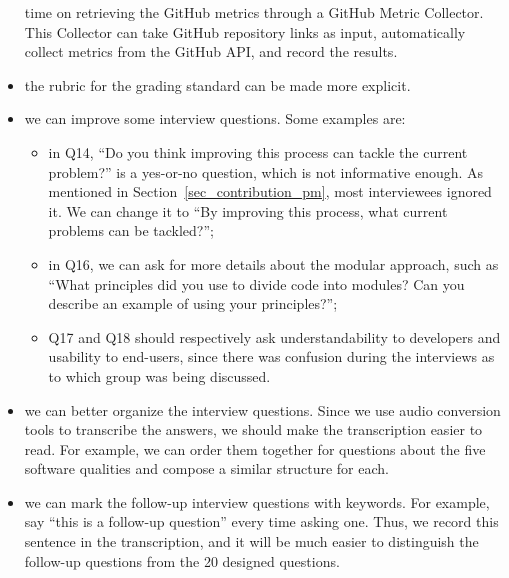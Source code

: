 \documentclass[final, 3p, times, authoryear]{elsarticle}
\begin{document}
\begin{itemize}
	time on retrieving the GitHub metrics through a GitHub Metric Collector.
	This Collector can take GitHub repository links as input, automatically
	collect metrics from the GitHub API, and record the results.
	\item the rubric for the grading standard can be made more explicit.
	\item we can improve some interview questions. Some examples are:
	\begin{itemize}
	    \item in {Q14}, ``Do you think improving this process can
	    tackle the current problem?'' is a yes-or-no question, which is not
	    informative enough. As mentioned in Section~\ref{sec_contribution_pm},
	    most interviewees ignored it. We can change it to ``By improving this
	    process, what current problems can be tackled?''; 
	    \item in {Q16}, we can ask for more details about the modular
	    approach, such as ``What principles did you use to divide code into
	    modules? Can you describe an example of using your principles?'';
	    \item {Q17} and {Q18} should respectively ask understandability to
	    developers and usability to end-users, since there was confusion during
	    the interviews as to which group was being discussed.
	\end{itemize}
	\item we can better organize the interview questions. Since we use audio
	conversion tools to transcribe the answers, we should make the transcription
	easier to read. For example, we can order them together for questions about
	the five software qualities and compose a similar structure for each.
	\item we can mark the follow-up interview questions with keywords. For
	example, say ``this is a follow-up question'' every time asking one. Thus, we
	record this sentence in the transcription, and it will be much easier to
	distinguish the follow-up questions from the 20 designed questions.
\end{itemize}



\end{document}
